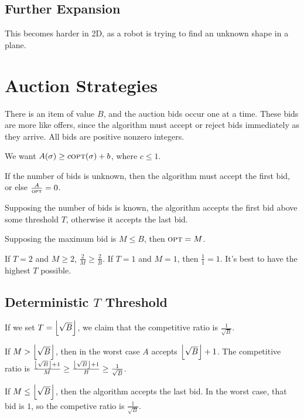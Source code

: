                 \subsection{Further Expansion} %
                \label{sub:further_expansion}
                    This becomes harder in 2D, as a robot is trying to find an unknown shape in a plane.
            \section{Auction Strategies} %
            \label{sec:auction_strategies}
                There is an item of value $B$, and the auction bids occur one at a time.
                These bids are more like offers, since the algorithm must accept or reject bids immediately as they arrive.
                All bids are positive nonzero integers.

                We want $A(\sigma) \ge c \textsc{opt}(\sigma) + b$, where $c \le 1$.

                If the number of bids is unknown, then the algorithm must accept the first bid, or else $\frac{A}{\textsc{opt}} = 0$.

                Supposing the number of bids is known, the algorithm accepts the first bid above some threshold $T$, otherwise it accepts the last bid.

                Supposing the maximum bid is $M \le B$, then $\textsc{opt} = M$.

                If $T = 2$ and $M \ge 2$, $\frac{2}{M} \ge \frac{2}{B}$.
                If $T = 1$ and $M = 1$, then $\frac{1}{1} = 1$.
                It's best to have the highest $T$ possible.

                \subsection{Deterministic $T$ Threshold} %
                \label{sub:t_threshold}
                    If we set $T = \left \lfloor \sqrt{B} \right \rfloor$, we claim that the competitive ratio is $\frac{1}{\sqrt{B}}$.

                    If $M> \left \lfloor \sqrt{B} \right \rfloor$, then in the worst case $A$ accepts $\left \lfloor \sqrt{B} \right \rfloor + 1$.
                    The competitive ratio is $\frac{\left \lfloor \sqrt{B} \right \rfloor + 1}{M} \ge \frac{\left \lfloor \sqrt{B} \right \rfloor + 1}{B} \ge \frac{1}{\sqrt{B}}$.

                    If $M \le \left \lfloor \sqrt{B} \right \rfloor$, then the algorithm accepts the last bid.
                    In the worst case, that bid is $1$, so the competive ratio is $\frac{1}{\sqrt{B}}$.

